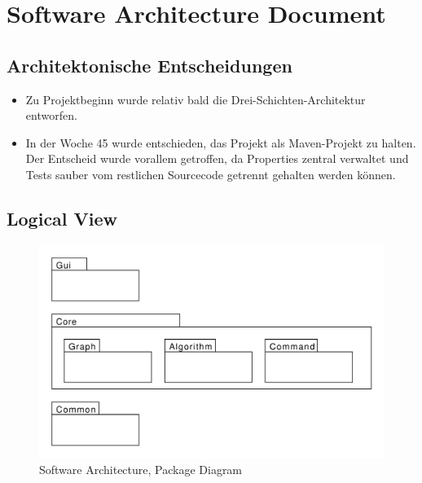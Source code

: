\section{Software Architecture Document}
\label{sec:Software Architecture Document}
% 
% 
% 
% 
% 
\subsection{Architektonische Entscheidungen}
\begin{itemize}
  \item Zu Projektbeginn wurde relativ bald die Drei-Schichten-Architektur entworfen.
  \item In der Woche 45 wurde entschieden, das Projekt als Maven-Projekt zu halten. Der Entscheid wurde vorallem getroffen, da Properties zentral verwaltet und Tests sauber vom restlichen Sourcecode getrennt gehalten werden k\"onnen.
\end{itemize}
% 
\subsection{Logical View}
\begin{figure}[H]
    \centering
    \includegraphics[scale=0.5]{diagrams/package-diagram.pdf}
    \caption{Software Architecture, Package Diagram}
    \label{fig:package-diagram}
\end{figure}
